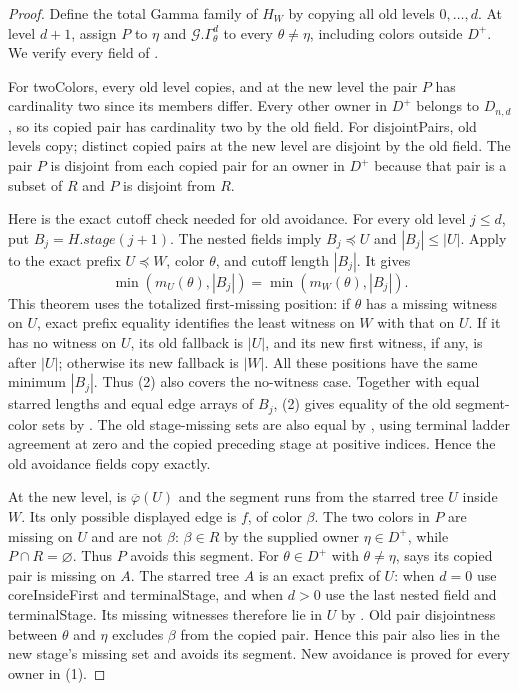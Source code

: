 \begin{proof}
Define the total Gamma family of $H_W$ by copying all old levels
$0,\ldots,d$. At level $d+1$, assign $P$ to $\eta$ and
$\mathcal G.\Gamma^d_\theta$ to every $\theta\ne\eta$, including
colors outside $D^+$. We verify every field of .

For twoColors, every old level copies, and at the new level the pair
$P$ has cardinality two since its members differ. Every other owner
in $D^+$ belongs to $D_{n,d}$, so its copied pair has cardinality
two by the old field. For disjointPairs, old levels copy; distinct
copied pairs at the new level are disjoint by the old field. The pair
$P$ is disjoint from each copied pair for an owner in $D^+$ because
that pair is a subset of $R$ and $P$ is disjoint from $R$.

Here is the exact cutoff check needed for old avoidance. For every
old level $j\le d$, put $B_j=H.\mathit{stage}(j+1)$.
The nested fields imply $B_j\preccurlyeq U$ and
$|B_j|\le|U|$. Apply 
to the exact prefix $U\preccurlyeq W$, color $\theta$, and cutoff
length $|B_j|$. It gives
\[
 \min(m_U(\theta),|B_j|)=\min(m_W(\theta),|B_j|).            \tag{2}
\]
This theorem uses the totalized first-missing position: if $\theta$
has a missing witness on $U$, exact prefix equality identifies the
least witness on $W$ with that on $U$. If it has no witness on $U$,
its old fallback is $|U|$, and its new first witness, if any, is after
$|U|$; otherwise its new fallback is $|W|$. All these positions have
the same minimum $|B_j|$. Thus (2) also covers the no-witness case.
Together with equal starred lengths and equal edge arrays of $B_j$,
(2) gives equality of the old segment-color sets by
. The old stage-missing sets are
also equal by , using terminal
ladder agreement at zero and the copied preceding stage at positive
indices. Hence the old avoidance fields copy exactly.

At the new level,  is
$\overline\varphi(U)$ and the segment runs from the starred tree $U$
inside $W$. Its only possible displayed edge is $f$, of color $\beta$.
The two colors in $P$ are missing on $U$ and are not $\beta$:
$\beta\in R$ by the supplied owner $\eta\in D^+$, while
$P\cap R=\varnothing$. Thus $P$ avoids this segment.
For $\theta\in D^+$ with $\theta\ne\eta$,
 says its copied pair is
missing on $A$. The starred tree $A$ is an exact prefix of $U$:
when $d=0$ use coreInsideFirst and terminalStage, and when $d>0$
use the last nested field and terminalStage. Its missing witnesses
therefore lie in $U$ by
.
Old pair disjointness between $\theta$ and $\eta$ excludes $\beta$
from the copied pair. Hence this pair also lies in the new stage's
missing set and avoids its segment. New avoidance is proved for
every owner in (1).


\end{proof}
